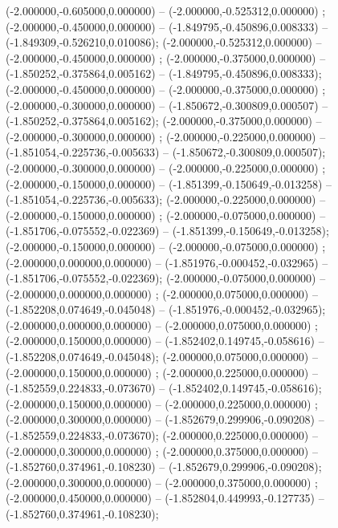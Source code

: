  (-2.000000,-0.605000,0.000000) -- (-2.000000,-0.525312,0.000000) ;
 (-2.000000,-0.450000,0.000000) -- (-1.849795,-0.450896,0.008333) -- (-1.849309,-0.526210,0.010086);
 (-2.000000,-0.525312,0.000000) -- (-2.000000,-0.450000,0.000000) ;
 (-2.000000,-0.375000,0.000000) -- (-1.850252,-0.375864,0.005162) -- (-1.849795,-0.450896,0.008333);
 (-2.000000,-0.450000,0.000000) -- (-2.000000,-0.375000,0.000000) ;
 (-2.000000,-0.300000,0.000000) -- (-1.850672,-0.300809,0.000507) -- (-1.850252,-0.375864,0.005162);
 (-2.000000,-0.375000,0.000000) -- (-2.000000,-0.300000,0.000000) ;
 (-2.000000,-0.225000,0.000000) -- (-1.851054,-0.225736,-0.005633) -- (-1.850672,-0.300809,0.000507);
 (-2.000000,-0.300000,0.000000) -- (-2.000000,-0.225000,0.000000) ;
 (-2.000000,-0.150000,0.000000) -- (-1.851399,-0.150649,-0.013258) -- (-1.851054,-0.225736,-0.005633);
 (-2.000000,-0.225000,0.000000) -- (-2.000000,-0.150000,0.000000) ;
 (-2.000000,-0.075000,0.000000) -- (-1.851706,-0.075552,-0.022369) -- (-1.851399,-0.150649,-0.013258);
 (-2.000000,-0.150000,0.000000) -- (-2.000000,-0.075000,0.000000) ;
 (-2.000000,0.000000,0.000000) -- (-1.851976,-0.000452,-0.032965) -- (-1.851706,-0.075552,-0.022369);
 (-2.000000,-0.075000,0.000000) -- (-2.000000,0.000000,0.000000) ;
 (-2.000000,0.075000,0.000000) -- (-1.852208,0.074649,-0.045048) -- (-1.851976,-0.000452,-0.032965);
 (-2.000000,0.000000,0.000000) -- (-2.000000,0.075000,0.000000) ;
 (-2.000000,0.150000,0.000000) -- (-1.852402,0.149745,-0.058616) -- (-1.852208,0.074649,-0.045048);
 (-2.000000,0.075000,0.000000) -- (-2.000000,0.150000,0.000000) ;
 (-2.000000,0.225000,0.000000) -- (-1.852559,0.224833,-0.073670) -- (-1.852402,0.149745,-0.058616);
 (-2.000000,0.150000,0.000000) -- (-2.000000,0.225000,0.000000) ;
 (-2.000000,0.300000,0.000000) -- (-1.852679,0.299906,-0.090208) -- (-1.852559,0.224833,-0.073670);
 (-2.000000,0.225000,0.000000) -- (-2.000000,0.300000,0.000000) ;
 (-2.000000,0.375000,0.000000) -- (-1.852760,0.374961,-0.108230) -- (-1.852679,0.299906,-0.090208);
 (-2.000000,0.300000,0.000000) -- (-2.000000,0.375000,0.000000) ;
 (-2.000000,0.450000,0.000000) -- (-1.852804,0.449993,-0.127735) -- (-1.852760,0.374961,-0.108230);
